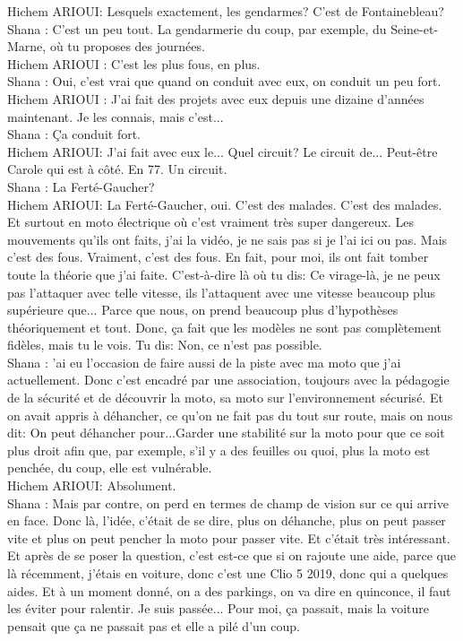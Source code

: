 Hichem ARIOUI: Lesquels exactement, les gendarmes? C'est de Fontainebleau?\\
Shana : C'est un peu tout. La gendarmerie du coup, par exemple, du Seine-et-Marne, où tu proposes des journées. \\
Hichem ARIOUI : C'est les plus fous, en plus. \\
Shana : Oui, c'est vrai que quand on conduit avec eux, on conduit un peu fort. \\
Hichem ARIOUI : J'ai fait des projets avec eux depuis une dizaine d'années maintenant. Je les connais, mais c'est... \\
Shana : Ça conduit fort. \\
Hichem ARIOUI: J'ai fait avec eux le... Quel circuit? Le circuit de... Peut-être Carole qui est à côté. En 77. Un circuit. \\
Shana : La Ferté-Gaucher? \\
Hichem ARIOUI: La Ferté-Gaucher, oui. C'est des malades. C'est des malades. Et surtout en moto électrique où c'est vraiment très super dangereux. Les mouvements qu'ils ont faits, j'ai la vidéo, je ne sais pas si je l'ai ici ou pas. Mais c'est des fous. Vraiment, c'est des fous. En fait, pour moi, ils ont fait tomber toute la théorie que j'ai faite. C'est-à-dire là où tu dis: Ce virage-là, je ne peux pas l'attaquer avec telle vitesse, ils l'attaquent avec une vitesse beaucoup plus supérieure que... Parce que nous, on prend beaucoup plus d'hypothèses théoriquement et tout. Donc, ça fait que les modèles ne sont pas complètement fidèles, mais tu le vois. Tu dis: Non, ce n'est pas possible. \\
Shana : 'ai eu l'occasion de faire aussi de la piste avec ma moto que j'ai actuellement. Donc c'est encadré par une association, toujours avec la pédagogie de la sécurité et de découvrir la moto, sa moto sur l'environnement sécurisé. Et on avait appris à déhancher, ce qu'on ne fait pas du tout sur route, mais on nous dit: On peut déhancher pour...Garder une stabilité sur la moto pour que ce soit plus droit afin que, par exemple, s'il y a des feuilles ou quoi, plus la moto est penchée, du coup, elle est vulnérable.\\
Hichem ARIOUI: Absolument. \\
Shana : Mais par contre, on perd en termes de champ de vision sur ce qui arrive en face. Donc là, l'idée, c'était de se dire, plus on déhanche, plus on peut passer vite et plus on peut pencher la moto pour passer vite. Et c'était très intéressant. Et après de se poser la question, c'est est-ce que si on rajoute une aide, parce que là récemment, j'étais en voiture, donc c'est une Clio 5 2019, donc qui a quelques aides. Et à un moment donné, on a des parkings, on va dire en quinconce, il faut les éviter pour ralentir. Je suis passée... Pour moi, ça passait, mais la voiture pensait que ça ne passait pas et elle a pilé d'un coup. \\

